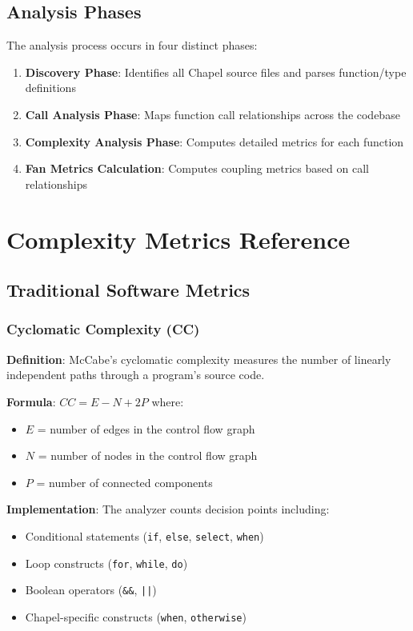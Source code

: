 \documentclass[11pt,a4paper]{article}
\begin{document}
\subsection{Analysis Phases}

The analysis process occurs in four distinct phases:

\begin{enumerate}
    \item \textbf{Discovery Phase}: Identifies all Chapel source files and parses function/type definitions
    \item \textbf{Call Analysis Phase}: Maps function call relationships across the codebase
    \item \textbf{Complexity Analysis Phase}: Computes detailed metrics for each function
    \item \textbf{Fan Metrics Calculation}: Computes coupling metrics based on call relationships
\end{enumerate}

\section{Complexity Metrics Reference}

\subsection{Traditional Software Metrics}

\subsubsection{Cyclomatic Complexity (CC)}

\textbf{Definition}: McCabe's cyclomatic complexity measures the number of linearly independent paths through a program's source code.

\textbf{Formula}: $CC = E - N + 2P$
where:
\begin{itemize}
    \item $E$ = number of edges in the control flow graph
    \item $N$ = number of nodes in the control flow graph  
    \item $P$ = number of connected components
\end{itemize}

\textbf{Implementation}: The analyzer counts decision points including:
\begin{itemize}
    \item Conditional statements (\texttt{if}, \texttt{else}, \texttt{select}, \texttt{when})
    \item Loop constructs (\texttt{for}, \texttt{while}, \texttt{do})
    \item Boolean operators (\texttt{\&\&}, \texttt{||})
    \item Chapel-specific constructs (\texttt{when}, \texttt{otherwise})
\end{itemize}
\end{document}
